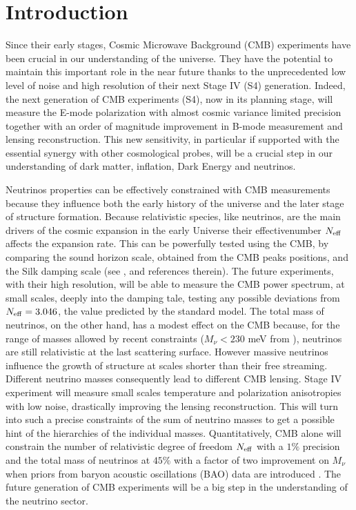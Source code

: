 \documentclass[aps,prd,reprint,superscriptaddress]{revtex4-1}
\begin{document}
\section{Introduction}\label{sec:intro}
Since their early stages, Cosmic Microwave Background (CMB) experiments have been crucial in our understanding of the universe. They have the potential to maintain this important role in the near future thanks to the unprecedented low level of noise and high resolution of their next Stage IV (S4) generation. 
Indeed, the next generation of CMB experiments (S4), now in its planning stage, will measure the E-mode polarization with almost cosmic variance limited precision together with an order of magnitude improvement in B-mode measurement and lensing reconstruction.
This new sensitivity, in particular if supported with the essential synergy with other cosmological probes, will be a crucial step in our understanding of dark matter, inflation, Dark Energy and neutrinos. 

Neutrinos properties can be effectively constrained with CMB measurements because they influence both the early history of the universe and the later stage of structure formation. 
Because relativistic species, like neutrinos, are the main drivers of the cosmic expansion in the early Universe their effectivenumber $N_{\rm eff}$ affects the expansion rate. This can be powerfully tested using the CMB, by comparing the sound horizon scale, obtained from the CMB peaks positions, and the Silk damping scale (see \cite{2013arXiv1309.5383A}, \cite{2013PhRvD..87h3008H} and references therein). 
The future experiments, with their high resolution, will be able to measure the CMB power spectrum, at small scales, deeply into the damping tale, testing any possible deviations from $N_{\rm eff}=3.046$, the value predicted by the standard model.
The total mass of neutrinos, on the other hand, has a modest effect on the CMB because, for the range of masses allowed by recent constraints ($M_{\nu}<230$ meV from \cite{2014A&A...571A..16P}), neutrinos are still relativistic at the last scattering surface. However massive neutrinos influence the growth of structure at scales shorter than their free streaming. Different neutrino masses consequently lead to different CMB lensing. Stage IV experiment will measure small scales temperature and polarization anisotropies with low noise, drastically improving the lensing reconstruction. This will turn into such a precise constraints of the sum of neutrino masses to get a possible hint of the hierarchies of the individual masses. 
Quantitatively, CMB alone will constrain the number of relativistic degree of freedom $N_{\rm eff}$ with a $1\%$ precision and the total mass of neutrinos at $45\%$ with a factor of two improvement on $M_{\nu}$ when priors from baryon acoustic oscillations (BAO) data are introduced \cite{wu:2014}. The future generation of CMB experiments will be a big step in the understanding of the neutrino sector.
\end{document}
